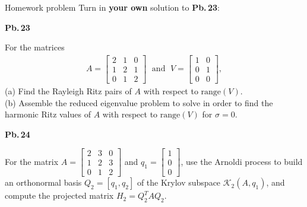 \documentclass[t,usepdftitle=false]{beamer}
\begin{document}
\begin{frame}{Homework problem}\vspace{.1cm}
Turn in \textbf{your own} solution to \textbf{Pb.$\,$23}:\vspace{.15cm}\\
\begin{minipage}[t]{0.1\textwidth}
\textbf{Pb.$\,$23}
\end{minipage}
\begin{minipage}[t]{0.89\textwidth}
For the matrices 
\begin{align*}
A=
\begin{bmatrix}
2&1&0\\
1&2&1\\
0&1&2
\end{bmatrix}
\;\text{ and }\;
V=
\begin{bmatrix}
1&0\\0&1\\0&0
\end{bmatrix},
\end{align*}
(a) Find the Rayleigh Ritz pairs of $A$ with respect to $\text{range}(V)$.\vspace{.1cm}\\
(b) Assemble the reduced eigenvalue problem to solve in order to find the harmonic Ritz values of $A$ with respect to $\text{range}(V)$ for $\sigma=0$.
\end{minipage}\vspace{.15cm}
\begin{minipage}[t]{0.1\textwidth}
\textbf{Pb.$\,$24}
\end{minipage}
\begin{minipage}[t]{0.89\textwidth}
For the matrix
$A=\begin{bmatrix}2&3&0\\1&2&3\\0&1&2\end{bmatrix}$
and
$q_1=\begin{bmatrix}1\\0\\0\end{bmatrix}$,
use the Arnoldi process to build an orthonormal basis $Q_2=[q_1,q_2]$ of the Krylov subspace $\mathcal{K}_2(A,q_1)$, and compute the projected matrix $H_2=Q_2^TAQ_2$.
\end{minipage}\vspace{.15cm}
\end{frame}
\end{document}
